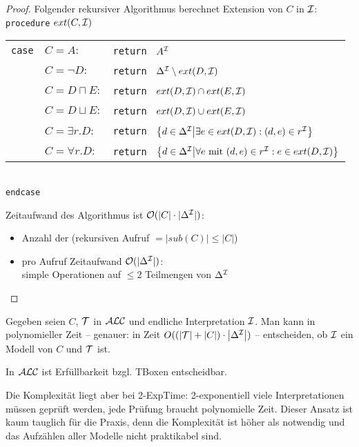 \begin{proof}
    Folgender rekursiver Algorithmus berechnet Extension von $C$ in $\mathcal{I}$:\\
    \texttt{procedure} $ext(C, \mathcal{I})$\\
    \begin{tabular}{l l l}
        \texttt{case} & $C = A:$ & \texttt{return } $A^{\mathcal{I}}$\\
                      & $C = \neg D:$ & \texttt{return }
        $\Delta^{\mathcal{I}} \setminus ext(D, \mathcal{I})$\\
                      & $C = D \sqcap E:$ & \texttt{return }
        $ext(D, \mathcal{I}) \cap ext(E, \mathcal{I})$\\
                      & $C = D \sqcup E:$ & \texttt{return }
        $ext(D, \mathcal{I}) \cup ext(E, \mathcal{I})$\\
                      & $C = \exists r.D:$ & \texttt{return }
        $\left\{d\in \Delta^{\mathcal{I}} \middle| \exists e\in ext(D, \mathcal{I}) : (d, e) \in r^{\mathcal{I}}\right\}$\\
                      & $C = \forall r.D:$ & \texttt{return }
        $\left\{d\in \Delta^{\mathcal{I}} \middle| \forall e \text{ mit } (d, e) \in r^{\mathcal{I}} : e\in ext(D, \mathcal{I})\right\}$\\
    \end{tabular}\\
    \texttt{endcase}

    Zeitaufwand des Algorithmus ist $\mathcal{O}(|C| \cdot |\Delta^{\mathcal{I}}|)$:
    \begin{itemize}
        \item Anzahl der (rekursiven Aufruf $= |sub(C)| \leq |C|$)
        \item pro Aufruf Zeitaufwand $\mathcal{O}(|\Delta^{\mathcal{I}}|)$: \\
            simple Operationen auf $\leq 2$ Teilmengen von $\Delta^{\mathcal{I}}$
    \end{itemize}
\end{proof}

\begin{korollar}
Gegeben seien $C$, $\mathcal{T}$ in $\mathcal{A}\mathcal{L}\mathcal{C}$ und endliche Interpretation $\mathcal{I}$. Man kann in polynomieller Zeit -- genauer: in Zeit $O(\left( \left| \mathcal{T} \right| + \left| C \right| \right) \cdot \left| \Delta^{\mathcal{I}} \right|)$ -- entscheiden, ob $\mathcal{I}$ ein Modell von $C$ und $\mathcal{T}$ ist.
\end{korollar}

\begin{theorem}
In $\mathcal{A}\mathcal{L}\mathcal{C}$ ist Erfüllbarkeit bzgl. TBoxen entscheidbar.
\end{theorem}

Die Komplexität liegt aber bei \textsf{2-ExpTime}: 2-exponentiell viele
Interpretationen müssen geprüft werden, jede Prüfung braucht polynomielle Zeit.
Dieser Ansatz ist kaum tauglich für die Praxis, denn die Komplexität ist höher
als notwendig und das Aufzählen aller Modelle nicht praktikabel sind.
